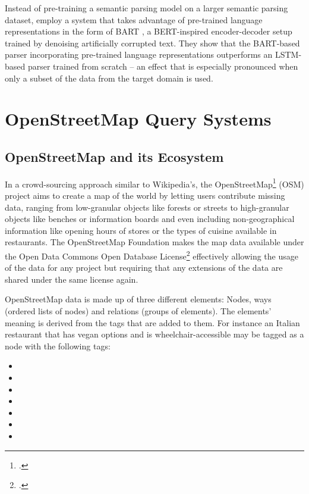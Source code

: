 Instead of pre-training a semantic parsing model on a larger semantic parsing
dataset, \textcite{xilun-2020} employ a system that takes advantage of
pre-trained language representations in the form of BART \parencite{lewis-2020},
a BERT-inspired encoder-decoder setup trained by denoising artificially
corrupted text. They show that the BART-based parser incorporating pre-trained
language representations outperforms an LSTM-based \parencite{hochreiter-1997}
parser trained from scratch – an effect that is especially pronounced when only
a subset of the data from the target domain is used.

\section{OpenStreetMap Query Systems}

\subsection{OpenStreetMap and its Ecosystem}
\label{sec:osm}

In a crowd-sourcing approach similar to Wikipedia’s, the
OpenStreetMap\footcite{openstreetmap} (OSM) project aims to create a map of the
world by letting users contribute missing data, ranging from low-granular
objects like forests or streets to high-granular objects like benches or
information boards and even including non-geographical information like opening
hours of stores or the types of cuisine available in restaurants. The
OpenStreetMap Foundation makes the map data available under the Open Data
Commons Open Database License\footcite{odbl} effectively allowing the usage of
the data for any project but requiring that any extensions of the data are
shared under the same license again.

OpenStreetMap data is made up of three different elements: Nodes, ways (ordered
lists of nodes) and relations (groups of elements). The elements’ meaning is
derived from the tags that are added to them. For instance an Italian restaurant
that has vegan options and is wheelchair-accessible may be tagged as a node with
the following tags:

\begin{itemize}
\item {}
\item {}
\item {}
\item {}
\item {}
\item {}
\item {}
\end{itemize}

